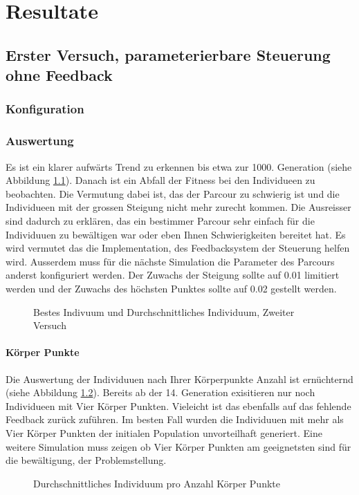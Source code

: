 %
%


\chapter{Resultate\label{chap:Resulate}}

\section{Erster Versuch, parameterierbare Steuerung ohne Feedback}

  \subsection{Konfiguration}
      

  \subsection{Auswertung}
    Es ist ein klarer aufwärts Trend zu erkennen bis etwa zur 1000. Generation (siehe Abbildung \ref{fig:graphFirst}).
    Danach ist ein Abfall der Fitness bei den Individueen zu beobachten.
    Die Vermutung dabei ist, das der Parcour zu schwierig ist und die Individueen
    mit der grossen Steigung nicht mehr zurecht kommen. Die Ausreisser sind dadurch zu erklären,
    das ein bestimmer Parcour sehr einfach für die Individuuen zu bewältigen war oder eben Ihnen Schwierigkeiten bereitet hat.
    Es wird vermutet das die Implementation, des Feedbacksystem der Steuerung helfen wird.
    Ausserdem muss für die nächste Simulation die Parameter des Parcours anderst konfiguriert werden.
    Der Zuwachs der Steigung sollte auf 0.01 limitiert werden und der Zuwachs des höchsten Punktes
    sollte auf 0.02 gestellt werden.
      \begin{figure}
        
        \caption{Bestes Indivuum und Durchschnittliches Individuum, Zweiter Versuch}
        \label{fig:graphFirst}
      \end{figure}

  \subsubsection{Körper Punkte\label{subsub:bp}}
    Die Auswertung der Individuuen nach Ihrer Körperpunkte Anzahl ist ernüchternd (siehe Abbildung \ref{fig:graphBpFirst}).
    Bereits ab der 14. Generation exisitieren nur noch Individueen mit Vier Körper Punkten.
    Vieleicht ist das ebenfalls auf das fehlende Feedback zurück zuführen. Im besten Fall
    wurden die Individuuen mit mehr als Vier Körper Punkten der initialen Population unvorteilhaft generiert.
    Eine weitere Simulation muss zeigen ob Vier Körper Punkten am geeignetsten sind für die bewältigung,
    der Problemstellung.
  \begin{figure}
    
    \caption{Durchschnittliches Individuum pro Anzahl Körper Punkte}
    \label{fig:graphBpFirst}
  \end{figure}

